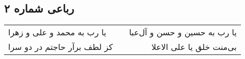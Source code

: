 \begin{center}
\section*{رباعی شماره ۲}
\label{sec:sh002}
\begin{longtable}{l p{0.5cm} r}
یا رب به محمد و علی و زهرا
&&
یا رب به حسین و حسن و آل‌عبا
\\
کز لطف برآر حاجتم در دو سرا
&&
بی‌منت خلق یا علی الاعلا
\\
\end{longtable}
\end{center}
